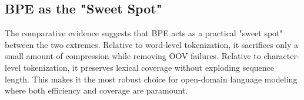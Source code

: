 \subsection{BPE as the "Sweet Spot"}
The comparative evidence suggests that BPE acts as a practical "sweet spot" between the two extremes. Relative to word-level tokenization, it sacrifices only a small amount of compression while removing OOV failures. Relative to character-level tokenization, it preserves lexical coverage without exploding sequence length. This makes it the most robust choice for open-domain language modeling where both efficiency and coverage are paramount.
